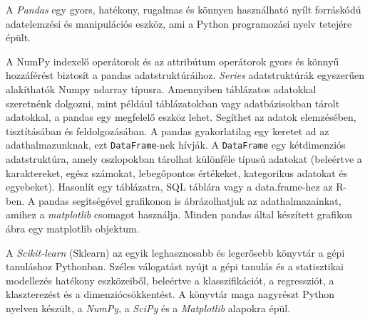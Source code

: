 
A \textit{Pandas} egy gyors, hatékony, rugalmas és könnyen használható nyílt forráskódú adatelemzési és manipulációs eszköz, ami a Python programozási nyelv tetejére épült.

A NumPy indexelő operátorok és az attribútum operátorok gyors és könnyű hozzáférést biztosít a pandas adatstruktúráihoz. \textit{Series} adatstruktúrák egyszerűen alakíthatók Numpy ndarray típusra.
Amennyiben táblázatos adatokkal szeretnénk dolgozni, mint például táblázatokban vagy adatbázisokban tárolt adatokkal, a pandas egy megfelelő eszköz lehet. Segíthet az adatok elemzésében, tisztításában és feldolgozásában. A pandas gyakorlatilag egy keretet ad az adathalmazunknak, ezt \texttt{DataFrame}-nek hívják. A \texttt{DataFrame} egy kétdimenziós adatstruktúra, amely oszlopokban tárolhat különféle típusú adatokat (beleértve a karaktereket, egész számokat, lebegőpontos értékeket, kategorikus adatokat és egyebeket). Hasonlít egy táblázatra, SQL táblára vagy a data.frame-hez az R-ben.
A pandas segítségével grafikonon is ábrázolhatjuk az adathalmazainkat, amihez a \textit{matplotlib} csomagot használja. Minden pandas által készített grafikon ábra egy matplotlib objektum.



A \textit{Scikit-learn} (Sklearn) az egyik leghasznosabb és legerősebb könyvtár a gépi tanuláshoz Pythonban. Széles válogatást nyújt a gépi tanulás és a statisztikai modellezés hatékony eszközeiből, beleértve a klasszifikációt, a regressziót, a klaszterezést és a dimenziócsökkentést. A könyvtár maga nagyrészt Python nyelven készült, a \textit{NumPy}, a \textit{SciPy} és a \textit{Matplotlib} alapokra épül.
